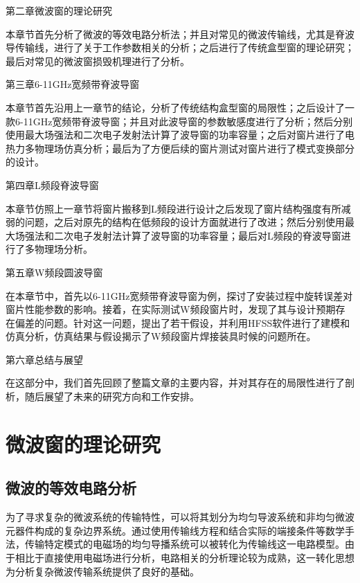 \documentclass[master]{thesis-uestc}
\begin{document}
第二章\hspace{6pt}微波窗的理论研究

本章节首先分析了微波的等效电路分析法；并且对常见的微波传输线，尤其是脊波导传输线，进行了关于工作参数相关的分析；之后进行了传统盒型窗的理论研究；最后对常见的微波窗损毁机理进行了分析。

第三章\hspace{6pt}6-11GHz宽频带脊波导窗

本章节首先沿用上一章节的结论，分析了传统结构盒型窗的局限性；之后设计了一款6-11GHz宽频带脊波导窗；并且对此波导窗的参数敏感度进行了分析；然后分别使用最大场强法和二次电子发射法计算了波导窗的功率容量；之后对窗片进行了电热力多物理场仿真分析；最后为了方便后续的窗片测试对窗片进行了模式变换部分的设计。

第四章\hspace{6pt}L频段脊波导窗

本章节仿照上一章节将窗片搬移到L频段进行设计之后发现了窗片结构强度有所减弱的问题，之后对原先的结构在低频段的设计方面就进行了改进；然后分别使用最大场强法和二次电子发射法计算了波导窗的功率容量；最后对L频段的脊波导窗进行了多物理场分析。

第五章\hspace{6pt}W频段圆波导窗

在本章节中，首先以6-11GHz宽频带脊波导窗为例，探讨了安装过程中旋转误差对窗片性能参数的影响。接着，在实际测试W频段窗片时，发现了其与设计预期存在偏差的问题。针对这一问题，提出了若干假设，并利用HFSS软件进行了建模和仿真分析，仿真结果与假设揭示了W频段窗片焊接装具时候的问题所在。

第六章\hspace{6pt}总结与展望

在这部分中，我们首先回顾了整篇文章的主要内容，并对其存在的局限性进行了剖析，随后展望了未来的研究方向和工作安排。


\chapter{微波窗的理论研究}

\section{微波的等效电路分析}
为了寻求复杂的微波系统的传输特性，可以将其划分为均匀导波系统和非均匀微波元器件构成的复杂边界系统。通过使用传输线方程和结合实际的端接条件等数学手法，传输特定模式的电磁场的均匀导播系统可以被转化为传输线这一电路模型。由于相比于直接使用电磁场进行分析，电路相关的分析理论较为成熟，这一转化思想为分析复杂微波传输系统提供了良好的基础。
\end{document}

